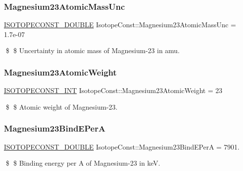 \subsubsection{\texorpdfstring{Magnesium23\+Atomic\+Mass\+Unc}{Magnesium23AtomicMassUnc}}
{\footnotesize\ttfamily \mbox{\hyperlink{group___isotope_const-_macros_ga8f45a7272ce02c0b4c65c44636ed719a}{I\+S\+O\+T\+O\+P\+E\+C\+O\+N\+S\+T\+\_\+\+D\+O\+U\+B\+LE}} Isotope\+Const\+::\+Magnesium23\+Atomic\+Mass\+Unc = 1.\+7e-\/07}

\$ \$ Uncertainty in atomic mass of Magnesium-\/23 in amu. \mbox{\label{group___isotope_const-_magnesium-_mg23_ga86e8404440e37eee2c126fb3e973524d}} 
\subsubsection{\texorpdfstring{Magnesium23\+Atomic\+Weight}{Magnesium23AtomicWeight}}
{\footnotesize\ttfamily \mbox{\hyperlink{group___isotope_const-_macros_ga5f18360b3e99483a35c32d789e62621c}{I\+S\+O\+T\+O\+P\+E\+C\+O\+N\+S\+T\+\_\+\+I\+NT}} Isotope\+Const\+::\+Magnesium23\+Atomic\+Weight = 23}

\$ \$ Atomic weight of Magnesium-\/23. \mbox{\label{group___isotope_const-_magnesium-_mg23_ga6185e17453ebb7ab6f5493d4531df59e}} 
\subsubsection{\texorpdfstring{Magnesium23\+Bind\+E\+PerA}{Magnesium23BindEPerA}}
{\footnotesize\ttfamily \mbox{\hyperlink{group___isotope_const-_macros_ga8f45a7272ce02c0b4c65c44636ed719a}{I\+S\+O\+T\+O\+P\+E\+C\+O\+N\+S\+T\+\_\+\+D\+O\+U\+B\+LE}} Isotope\+Const\+::\+Magnesium23\+Bind\+E\+PerA = 7901.}

\$ \$ Binding energy per A of Magnesium-\/23 in keV. \mbox{\label{group___isotope_const-_magnesium-_mg23_gac67f98e560283ea6b0f34654fd58820b}} 
